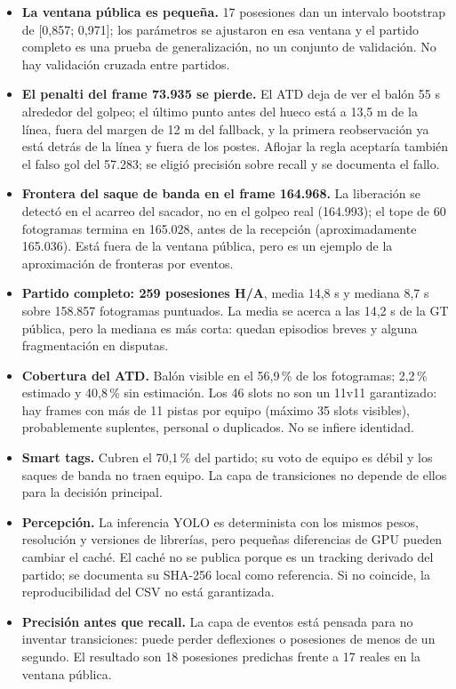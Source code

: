 \documentclass[10pt,a4paper]{article}
\begin{document}
\begin{itemize}
\item \textbf{La ventana pública es pequeña.} 17 posesiones dan un intervalo bootstrap de
[0,857; 0,971]; los parámetros se ajustaron en esa ventana y el partido completo es una prueba de
generalización, no un conjunto de validación. No hay validación cruzada entre partidos.
\item \textbf{El penalti del frame 73.935 se pierde.} El ATD deja de ver el balón 55 s alrededor
del golpeo; el último punto antes del hueco está a 13,5 m de la línea, fuera del margen de 12 m
del fallback, y la primera reobservación ya está detrás de la línea y fuera de los postes. Aflojar
la regla aceptaría también el falso gol del 57.283; se eligió precisión sobre recall y se
documenta el fallo.
\item \textbf{Frontera del saque de banda en el frame 164.968.} La liberación se detectó en el
acarreo del sacador, no en el golpeo real (164.993); el tope de 60 fotogramas termina en 165.028,
antes de la recepción (aproximadamente 165.036). Está fuera de la ventana pública, pero es un
ejemplo de la aproximación de fronteras por eventos.
\item \textbf{Partido completo: 259 posesiones H/A}, media 14,8 s y mediana 8,7 s sobre 158.857
fotogramas puntuados. La media se acerca a las 14,2 s de la GT pública, pero la mediana es más
corta: quedan episodios breves y alguna fragmentación en disputas.
\item \textbf{Cobertura del ATD.} Balón visible en el 56,9\,\% de los fotogramas; 2,2\,\% estimado
y 40,8\,\% sin estimación. Los 46 slots no son un 11v11 garantizado: hay frames con más de 11 pistas por
equipo (máximo 35 slots visibles), probablemente suplentes, personal o duplicados. No se infiere
identidad.
\item \textbf{Smart tags.} Cubren el 70,1\,\% del partido; su voto de equipo es débil y los saques
de banda no traen equipo. La capa de transiciones no depende de ellos para la decisión principal.
\item \textbf{Percepción.} La inferencia YOLO es determinista con los mismos pesos, resolución y
versiones de librerías, pero pequeñas diferencias de GPU pueden cambiar el caché. El caché no se
publica porque es un tracking derivado del partido; se documenta su SHA-256 local como referencia.
Si no coincide, la reproducibilidad del CSV no está garantizada.
\item \textbf{Precisión antes que recall.} La capa de eventos está pensada para no inventar
transiciones: puede perder deflexiones o posesiones de menos de un segundo. El resultado son 18
posesiones predichas frente a 17 reales en la ventana pública.
\end{itemize}
\end{document}
